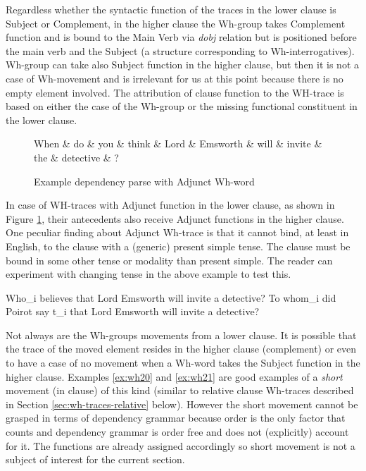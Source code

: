 Regardless whether the syntactic function of the traces in the lower clause is Subject or Complement, in the higher clause the Wh-group takes Complement function and is bound to the Main Verb via \textit{dobj} relation but is positioned before the main verb and the Subject (a structure corresponding to Wh-interrogatives). Wh-group can take also Subject function in the higher clause, but then it is not a case of Wh-movement and is irrelevant for us at this point because there is no empty element involved. The attribution of clause function to the WH-trace is based on either the case of the Wh-group or the missing functional constituent in the lower clause. 

\begin{figure}[!ht]
	\centering
	\begin{dependency}
		\begin{deptext}[]
			When \& do \& you \& think \& Lord \& Emsworth \& will \& invite \& the \& detective \& ?\\
		\end{deptext}
	\end{dependency}
	\caption{Example dependency parse with Adjunct Wh-word}
	\label{fig:e22}
\end{figure}

In case of WH-traces with Adjunct function in the lower clause, as shown in Figure \ref{fig:e22}, their antecedents also receive Adjunct functions in the higher clause. One peculiar finding about Adjunct Wh-trace is that it cannot bind, at least in English, to the clause with a (generic) present simple tense. The clause must be bound in some other tense or modality than present simple. The reader can experiment with changing tense in the above example to test this. 

\begin{exe}
	\ex\label{ex:wh20} Who_{i} believes that Lord Emsworth will invite a detective?
	\ex\label{ex:wh21} To whom_{i} did Poirot say t_{i} that Lord Emsworth will invite a detective?
\end{exe}

Not always are the Wh-groups movements from a lower clause. It is possible that the trace of the moved element resides in the higher clause (complement) or even to have a case of no movement when a Wh-word takes the Subject function in the higher clause. Examples \ref{ex:wh20} and \ref{ex:wh21} are good examples of a \textit{short} movement (in clause) of this kind (similar to relative clause Wh-traces described in Section \ref{sec:wh-traces-relative} below). However the short movement cannot be grasped in terms of dependency grammar because order is the only factor that counts and dependency grammar is order free and does not (explicitly) account for it. The functions are already assigned accordingly so short movement is not a subject of interest for the current section.

